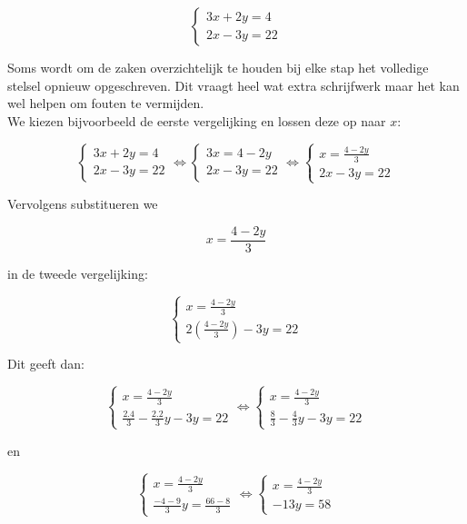\begin{voorbeeld}
	

\[\left\{ \begin{array}{l}
3x + 2y = 4\\
2x - 3y = 22
\end{array} \right.\]

Soms wordt om de zaken overzichtelijk te houden bij elke stap het volledige stelsel opnieuw opgeschreven. Dit vraagt heel wat extra schrijfwerk maar het kan wel helpen om fouten te vermijden.\\
We kiezen bijvoorbeeld de eerste vergelijking en lossen deze op naar $x$:

\[\left\{ \begin{array}{l}
3x + 2y = 4 \\
2x - 3y = 22
\end{array} \right. \Leftrightarrow \left\{ \begin{array}{l}
3x = 4 - 2y\\
2x - 3y = 22
\end{array} \right. \Leftrightarrow \left\{ \begin{array}{l}
x = \frac{4 - 2y}{3}\\
2x - 3y = 22
\end{array} \right.\]

Vervolgens substitueren we

\[x = \frac{4 - 2y}{3} \]

in de tweede vergelijking:

\[ \left\{ \begin{array}{l}
x = \frac{4 - 2y}{3}\\
2 ( \frac{4 - 2y}{3} ) - 3y = 22
\end{array} \right.\]

Dit geeft dan:

\[\left\{ \begin{array}{l}
x = \frac{4 - 2y}{3} \\
\frac{2.4}{3} -\frac{2.2}{3}y -3y = 22
\end{array} \right. \Leftrightarrow \left\{ \begin{array}{l}
x = \frac{4 - 2y}{3}\\
\frac{8}{3}-\frac{4}{3}y -3y = 22
\end{array} \right.\]

en

\[\left\{ \begin{array}{l}
x = \frac{4 - 2y}{3} \\
\frac{-4-9}{3}y = \frac{66-8}{3}
\end{array} \right. \Leftrightarrow \left\{ \begin{array}{l}
x = \frac{4 - 2y}{3}\\
-13y=58
\end{array} \right.\]


\end{voorbeeld}
